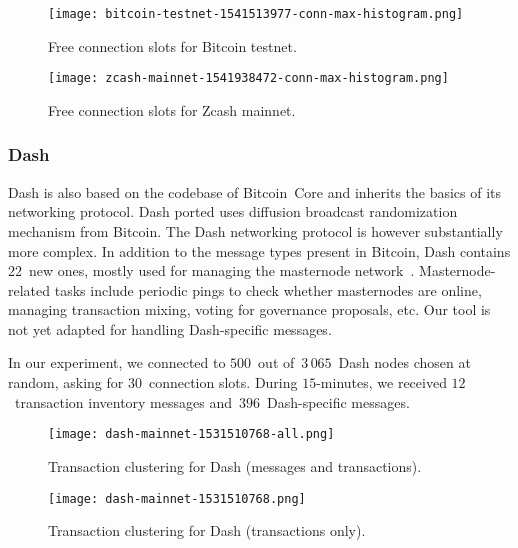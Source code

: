 \begin{figure*}
	\centering
	\begin{minipage}{0.5\textwidth}
		\centering
		\texttt{[image: bitcoin-testnet-1541513977-conn-max-histogram.png]}
		\caption{Free connection slots for Bitcoin testnet.}
		\label{fig:free-slots-bitcoin}
	\end{minipage}\hfill
	\begin{minipage}{0.5\textwidth}
		\centering
		\texttt{[image: zcash-mainnet-1541938472-conn-max-histogram.png]}
		\caption{Free connection slots for Zcash mainnet.}
		\label{fig:free-slots-zcash}
	\end{minipage}\hfill
\end{figure*}


\subsubsection{Dash}

Dash is also based on the codebase of Bitcoin~Core and inherits the basics of its networking protocol.
Dash ported uses diffusion broadcast randomization mechanism from Bitcoin.
The Dash networking protocol is however substantially more complex.
In addition to the message types present in Bitcoin, Dash contains $22$~new ones, mostly used for managing the masternode network~\cite{Schinzel2015}.
Masternode-related tasks include periodic pings to check whether masternodes are online, managing transaction mixing, voting for governance proposals, etc.
Our tool is not yet adapted for handling Dash-specific messages.

In our experiment, we connected to $500$~out of~$3\,065$~Dash nodes chosen at random, asking for $30$~connection slots.
During $15$-minutes, we received $12$~transaction inventory messages and~$396$~Dash-specific messages.

\begin{figure*}
	\centering
	\begin{minipage}{0.5\textwidth}
		\centering
		\texttt{[image: dash-mainnet-1531510768-all.png]}
		\caption{Transaction clustering for Dash (messages and transactions).}
		\label{fig:dash-all}
	\end{minipage}\hfill
	\begin{minipage}{0.5\textwidth}
		\centering
		\texttt{[image: dash-mainnet-1531510768.png]}
		\caption{Transaction clustering for Dash (transactions only).}
		\label{fig:dash-tx}
	\end{minipage}\hfill
\end{figure*}

